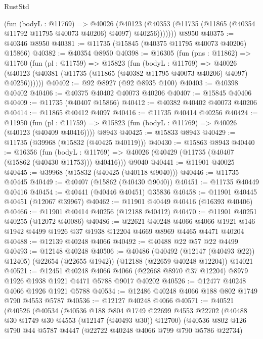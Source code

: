 \begin{lexlean}{RustStd}
\begin{coremodule}
          (fun (bodyL : @11769) =>
          @40026
            (@40123
              (@40353 (@11735 (@11865 (@40354 @11792 @11795 @40073 @40206) @4097) @40256)))))))
    @8950
@40375 := @40346 @8950
@40381 := @11735 (@15845 (@40375 @11795 @40073 @40206) @15866)
@40382 := @40354 @8950
@40398 := @16305
    (fun (pns : @11862) =>
    @11760
      (fun (pl : @11759) =>
      @15823
        (fun (bodyL : @11769) =>
        @40026 (@40123 (@40381 (@11735 (@11865 (@40382 @11795 @40073 @40206) @4097) @40256))))))
@40402 := @92 @8927 (@92 @8935 @100)
@40403 := @40398 @40402
@40406 := @40375 @40402 @40073 @40206
@40407 := @15845 @40406
@40409 := @11735 (@40407 @15866)
@40412 := @40382 @40402 @40073 @40206
@40414 := @11865 @40412 @4097
@40416 := @11735 @40414 @40256
@40424 := @11950
    (fun (pl : @11759) => @15823 (fun (bodyL : @11769) => @40026 (@40123 (@40409 @40416))))
    @8943
@40425 := @15833 @8943
@40429 := @11735 (@39968 (@15832 (@40425 @40119)))
@40430 := @15863 @8943
@40440 := @16356
    (fun (bodyL : @11769) => @40026 (@40429 (@11735 (@40407 (@15862 (@40430 @11753))) @40416)))
    @9040
@40441 := @11901 @40025
@40445 := @39968 (@15832 (@40425 (@40118 @9040)))
@40446 := @11735 @40445
@40449 := @40407 (@15862 (@40430 @9040))
@40451 := @11735 @40449 @40416
@40454 := @40441 (@40446 @40451) @35836
@40458 := @11901 @40445 @40451 (@12067 @39967)
@40462 := @11901 @40449 @40416 (@16393 @40406)
@40466 := @11901 @40414 @40256 (@12188 @40412)
@40470 := @11901 @40251 @40255 (@12072 @40086)
@40486 := @22621
    @40248
    @4066
    @4066
    @1921
    @146
    @1942
    @4499
    @1926
    @37
    @1938
    @12204
    @4669
    @8969
    @4465
    @4471
    @40204
@40488 := @12139 @40248 @4066
@40492 := @40488 @22 @57 @22 @4499
@40493 := @12148 @40248
@40506 := @40486
    (@40492 (@12147 (@40493 @22)) @12405)
    (@22654 (@22655 @1942))
    (@12188 (@22659 @40248 @12204))
    @14021
@40521 := @12451
    @40248
    @4066
    @4066
    (@22668 @8970 @37 @12204)
    @8979
    @1926
    @1938
    @1921
    @4471
    @5788
    @9017
    @40202
@40526 := @12477 @40248 @4066 @1926 @1921 @5788
@40534 := @12486 @40248 @4066 @188 @802 @1749 @790 @4553 @5787
@40536 := @12127 @40248 @4066
@40571 := @40521
    (@40526
      (@40534
        (@40536
          @188
          @804
          @1749
          @22699
          @4553
          @22702
          (@40488 @30 @1749 @30 @4553 (@12147 (@40493 @30)) @12700)
          (@40536
            @802
            @126
            @790
            @44
            @5787
            @4447
            (@22722 @40248 @4066 @799 @790 @5786 @22734)

\end{coremodule}
\end{lexlean}
